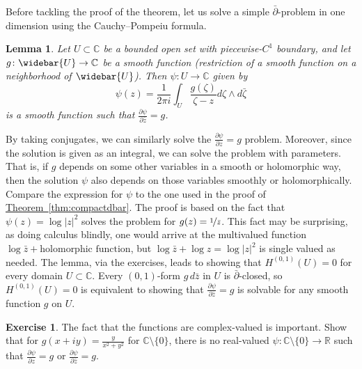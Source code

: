 \documentclass[12pt,openany]{book}
\newcommand{\sabs}[1]{\lvert {#1} \rvert}
\newcommand{\C}{{\mathbb{C}}}
\newcommand{\R}{{\mathbb{R}}}
\theoremstyle{plain}
\newtheorem{lemma}[thm]{Lemma}
\theoremstyle{remark}
\theoremstyle{definition}
\newenvironment{exbox}{%
    \def\FrameCommand{\vrule width 1pt \relax\hspace{10pt}}%
    \MakeFramed{\advance\hsize-\width\FrameRestore}%
}{%
    \endMakeFramed
}
\theoremstyle{exercise}
\newtheorem{exercise}{Exercise}[section]
\theoremstyle{example}
\newcommand{\thmref}[1]{\hyperref[#1]{Theorem~\ref*{#1}}}
\begin{document}
Before tackling the proof of the theorem, let us
solve a simple $\bar{\partial}$-problem in one dimension
using the Cauchy--Pompeiu formula.

\begin{lemma} \label{lemma:dbaronevar}
Let $U \subset \C$ be a bounded open set with piecewise-$C^1$ boundary,
and let $g \colon \widebar{U} \to \C$ be a smooth function (restriction of a
smooth function on a neighborhood of $\widebar{U}$).
Then $\psi \colon U \to \C$ given by
\begin{equation*}
\psi(z) =
\frac{1}{2\pi i} \int_U \frac{g(\zeta)}{\zeta-z} d\zeta \wedge d\bar{\zeta}
\end{equation*}
is a smooth function such that $\frac{\partial \psi}{\partial \bar{z}} = g$.
\end{lemma}

By taking conjugates, we can similarly solve the
$\frac{\partial \psi}{\partial z} = g$ problem.  Moreover, since the
solution is given as an integral, we can solve the problem with
parameters.  That is, if $g$ depends on some other variables in a smooth or
holomorphic way, then the solution $\psi$ also depends on those variables
smoothly or holomorphically.
Compare the expression for $\psi$ to the one used in the proof of
\thmref{thm:compactdbar}.
The proof is based on the fact that $\psi(z) = \log \sabs{z}^2$
solves the problem for $g(z) = \nicefrac{1}{\bar{z}}$.
This fact may be surprising, as doing calculus blindly, one would arrive
at the multivalued function $\log \bar{z} + \text{holomorphic function}$,
but $\log \bar{z} + \log z = \log \sabs{z}^2$ is single valued as needed.
The lemma, via the exercises, leads to showing that $H^{(0,1)}(U) = 0$ for
every domain $U \subset \C$.  Every $(0,1)$-form
$g \, d\bar{z}$ in $U$ is $\bar{\partial}$-closed, so $H^{(0,1)}(U) = 0$ is
equivalent to showing that $\frac{\partial \psi}{\partial \bar{z}} = g$
is solvable for any smooth function $g$ on $U$.

\begin{exbox}
\begin{exercise}
The fact that the functions are complex-valued is important.  Show that
for $g(x+iy) = \frac{y}{x^2+y^2}$ for $\C \setminus \{ 0 \}$,
there is no real-valued $\psi \colon \C \setminus \{ 0 \} \to \R$
such that
$\frac{\partial \psi}{\partial z} = g$ or
$\frac{\partial \psi}{\partial \bar{z}} = g$.
\end{exercise}
\end{exbox}
\end{document}

